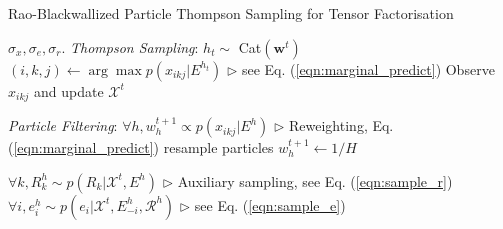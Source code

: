 \begin{algorithm}[t!]
   \caption{Rao-Blackwallized Particle Thompson Sampling for Tensor Factorisation}
   \label{alg:rbsmc}
\begin{algorithmic}
    $\sigma_x, \sigma_e, \sigma_r$.
   \STATE \textit{Thompson Sampling}:
   \STATE $h_t \sim $ Cat$(\mathbf{w}^{t})$
   \STATE $(i,k,j) \leftarrow \arg\max p(x_{ikj}| E^{h_t})$    \hfill $\triangleright$ see Eq. (\ref{eqn:marginal_predict})
   \STATE Observe $x_{ikj}$ and update $\mathcal{X}^{t}$

   \STATE \textit{Particle Filtering}:
   \STATE $\forall h, w_h^{t+1} \propto p(x_{ikj} | E^{h})$   \hfill $\triangleright$ Reweighting, Eq. (\ref{eqn:marginal_predict})
   \STATE resample particles
   \STATE $w_h^{t+1} \leftarrow 1/H$
   \ENDIF

   \STATE $\forall k, R_k^{h} \sim p(R_k | \mathcal{X}^{t}, E^{h})$   \hfill $\triangleright$ Auxiliary sampling, see Eq. (\ref{eqn:sample_r})
   \STATE $\forall i, e^{h}_i \sim p(e_i | \mathcal{X}^{t}, E^{h}_{-i}, \mathcal{R}^{h})$ \hfill $\triangleright$ see Eq. (\ref{eqn:sample_e})
   \ENDFOR

   \ENDFOR
\end{algorithmic}
\end{algorithm}

